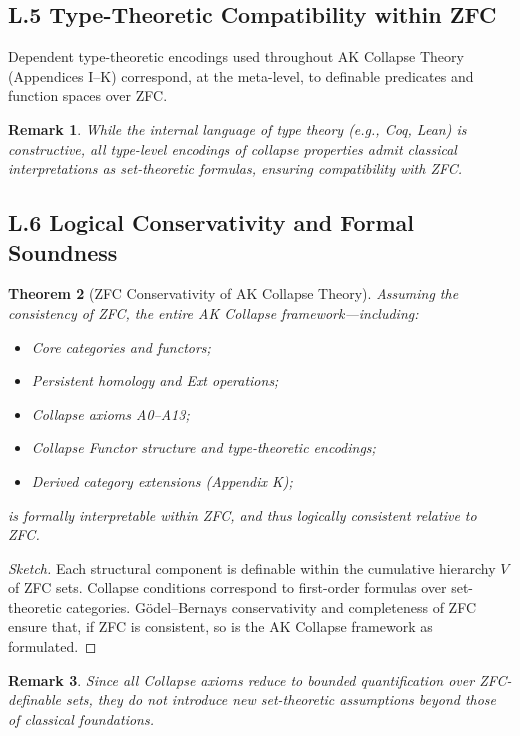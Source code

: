 \documentclass[11pt]{article}
\newtheorem{theorem}{Theorem}[section]
\newtheorem{remark}[theorem]{Remark}
\begin{document}
\subsection*{L.5 Type-Theoretic Compatibility within ZFC}

Dependent type-theoretic encodings used throughout AK Collapse Theory (Appendices I–K) correspond, at the meta-level, to definable predicates and function spaces over ZFC.

\begin{remark}
While the internal language of type theory (e.g., Coq, Lean) is constructive, all type-level encodings of collapse properties admit classical interpretations as set-theoretic formulas, ensuring compatibility with ZFC.
\end{remark}

\subsection*{L.6 Logical Conservativity and Formal Soundness}

\begin{theorem}[ZFC Conservativity of AK Collapse Theory]
Assuming the consistency of ZFC, the entire AK Collapse framework—including:

\begin{itemize}
    \item Core categories and functors;
    \item Persistent homology and Ext operations;
    \item Collapse axioms A0–A13;
    \item Collapse Functor structure and type-theoretic encodings;
    \item Derived category extensions (Appendix K);
\end{itemize}

is formally interpretable within ZFC, and thus logically consistent relative to ZFC.
\end{theorem}

\begin{proof}[Sketch]
Each structural component is definable within the cumulative hierarchy \( V \) of ZFC sets.  
Collapse conditions correspond to first-order formulas over set-theoretic categories.  
Gödel–Bernays conservativity and completeness of ZFC ensure that, if ZFC is consistent, so is the AK Collapse framework as formulated.
\end{proof}

\begin{remark}
Since all Collapse axioms reduce to bounded quantification over ZFC-definable sets,  
they do not introduce new set-theoretic assumptions beyond those of classical foundations.
\end{remark}
\end{document}
